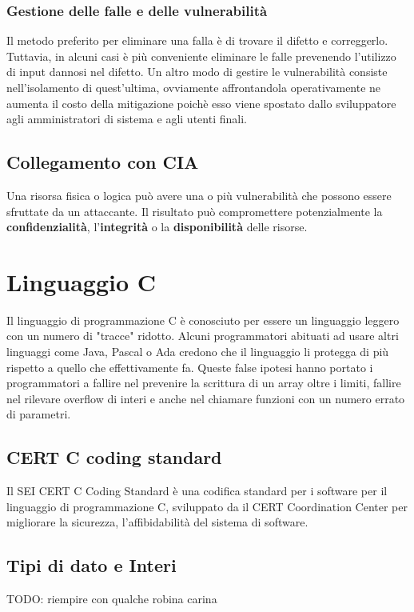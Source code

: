 \subsection{Gestione delle falle e delle vulnerabilità}
Il metodo preferito per eliminare una falla è di trovare il difetto e correggerlo. Tuttavia, in alcuni casi è più conveniente eliminare le falle prevenendo l'utilizzo di input dannosi nel difetto. Un altro modo di gestire le vulnerabilità consiste nell'isolamento di quest'ultima, ovviamente affrontandola operativamente ne aumenta il costo della mitigazione poichè esso viene spostato dallo sviluppatore agli amministratori di sistema e agli utenti finali.

\section{Collegamento con CIA}
Una risorsa fisica o logica può avere una o più vulnerabilità che possono essere sfruttate da un attaccante. Il risultato può compromettere potenzialmente la \textbf{confidenzialità}, l'\textbf{integrità} o la \textbf{disponibilità} delle risorse.

\chapter{Linguaggio C}
Il linguaggio di programmazione C è conosciuto per essere un linguaggio leggero con un numero di "tracce" ridotto.
Alcuni programmatori abituati ad usare altri linguaggi come Java, Pascal o Ada credono che il linguaggio li protegga di più rispetto a quello che effettivamente fa. Queste false ipotesi hanno portato i programmatori a fallire nel prevenire la scrittura di un array oltre i limiti, fallire nel rilevare overflow di interi e anche nel chiamare funzioni con un numero errato di parametri.

\section{CERT C coding standard}
Il SEI CERT C Coding Standard è una codifica standard per i software per il linguaggio di programmazione C, sviluppato da il CERT Coordination Center per migliorare la sicurezza, l'affibidabilità del sistema di software.

\section{Tipi di dato e Interi}
TODO: riempire con qualche robina carina

